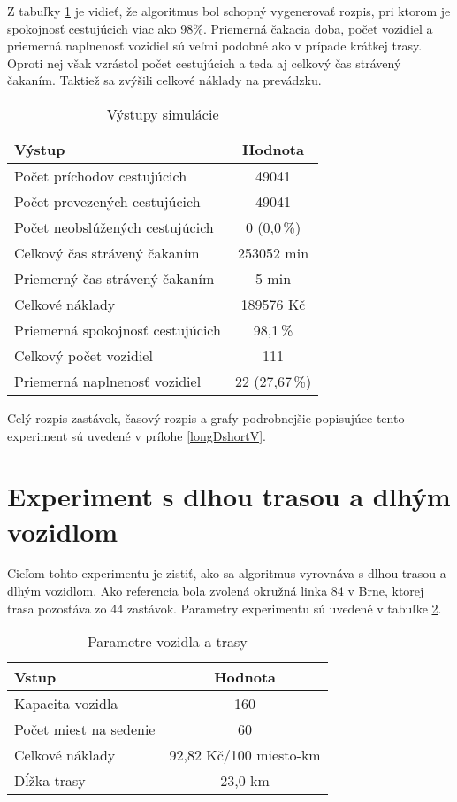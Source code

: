 Z tabuľky \ref{tab:longDshortVout} je vidieť, že algoritmus bol schopný vygenerovať rozpis, pri ktorom je spokojnosť cestujúcich viac ako 98\%.
Priemerná čakacia doba, počet vozidiel a priemerná naplnenosť vozidiel sú veľmi podobné ako v prípade krátkej trasy.
Oproti nej však vzrástol počet cestujúcich a teda aj celkový čas strávený čakaním.
Taktiež sa zvýšili celkové náklady na prevádzku.

\begin{table}[h]
  \centering
  \begin{tabular}{|l|c|}
    \hline
      \textbf{Výstup} & \textbf{Hodnota} \\ \hline
        Počet príchodov cestujúcich & 49041 \\ \hline
        Počet prevezených cestujúcich & 49041 \\ \hline
        Počet neobslúžených cestujúcich & 0 (0,0\,\%) \\ \hline
        Celkový čas strávený čakaním & 253052 min \\ \hline
        Priemerný čas strávený čakaním & 5 min \\ \hline
        Celkové náklady & 189576 Kč \\ \hline
        Priemerná spokojnosť cestujúcich & 98,1\,\% \\ \hline
        Celkový počet vozidiel & 111 \\ \hline
        Priemerná naplnenosť vozidiel & 22 (27,67\,\%) \\ \hline
  \end{tabular}
  \caption{Výstupy simulácie}
  \label{tab:longDshortVout}
\end{table}

Celý rozpis zastávok, časový rozpis a grafy podrobnejšie popisujúce tento experiment sú uvedené v prílohe \ref{longDshortV}.

\newpage
\section{Experiment s dlhou trasou a dlhým vozidlom}
Cieľom tohto experimentu je zistiť, ako sa algoritmus vyrovnáva s dlhou trasou a dlhým vozidlom.
Ako referencia bola zvolená okružná linka 84 v Brne, ktorej trasa pozostáva zo 44 zastávok.
Parametry experimentu sú uvedené v tabuľke \ref{tab:longDlongVin}.

\begin{table}[h]
  \centering
  \begin{tabular}{|l|c|}
    \hline
    \textbf{Vstup} & \textbf{Hodnota} \\ \hline
    Kapacita vozidla & 160 \\ \hline
    Počet miest na sedenie & 60 \\ \hline
    Celkové náklady & 92,82 Kč/100 miesto-km \\ \hline
    Dĺžka trasy & 23,0 km \\ \hline
  \end{tabular}
  \caption{Parametre vozidla a trasy}
  \label{tab:longDlongVin}
\end{table}

